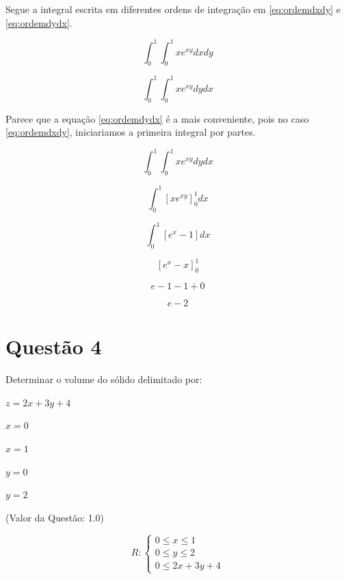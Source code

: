 \documentclass[10pt,a4paper]{article}
\begin{document}
	Segue a integral escrita em diferentes ordens de integração em \ref{eq:ordemdxdy} e \ref{eq:ordemdydx}.

	\begin{equation} \label{eq:ordemdxdy}
		\int_0^1 \int_0^1 x e^{xy} dx dy
	\end{equation}
	
	\begin{equation} \label{eq:ordemdydx}
		\int_0^1 \int_0^1 x e^{xy} dy dx
	\end{equation}
	
	Parece que a equação \ref{eq:ordemdydx} é a mais conveniente, pois no caso \ref{eq:ordemdxdy}, iniciariamos a primeira integral por partes.
	
	\begin{equation*}
		\int_0^1 \int_0^1 x e^{xy} dy dx
	\end{equation*}
	
	\begin{equation*}
		\int_0^1 \left[ x e^{xy} \right]_0^1 dx
	\end{equation*}
	
	\begin{equation*}
		\int_0^1 \left[ e^x - 1 \right] dx
	\end{equation*}
	
	\begin{equation*}
		\left[ e^x - x\right]_0^1
	\end{equation*}
	
	\begin{equation*}
		e - 1 - 1 + 0
	\end{equation*}
	
	\begin{equation}
		e - 2
	\end{equation}
	
	\section*{Questão 4}
	
	Determinar o volume do sólido delimitado por:
	
	$ z = 2x+3y+4 $
	
	$ x = 0 $
	
	$ x = 1 $
	
	$ y = 0 $
	
	$ y = 2 $
	
	(Valor da Questão: 1.0)
	
	
	
	\begin{equation*}
		R:
		\begin{cases}
			0 \le x \le 1 \\
			0 \le y \le 2 \\
			0 \le 2x + 3y + 4
		\end{cases}
	\end{equation*}
	
\end{document}

